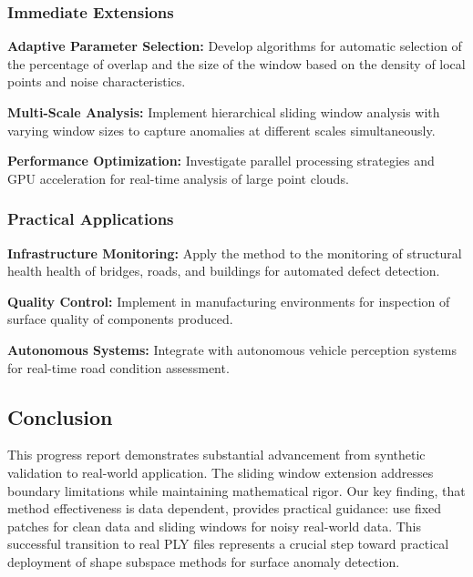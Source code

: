 \documentclass[../main.tex]{subfiles}
\begin{document}
\subsubsection{Immediate Extensions}

\textbf{Adaptive Parameter Selection:} Develop algorithms for automatic selection of the percentage of overlap and the size of the window based on the density of local points and noise characteristics.

\textbf{Multi-Scale Analysis:} Implement hierarchical sliding window analysis with varying window sizes to capture anomalies at different scales simultaneously.

\textbf{Performance Optimization:} Investigate parallel processing strategies and GPU acceleration for real-time analysis of large point clouds.

\subsubsection{Practical Applications}

\textbf{Infrastructure Monitoring:} Apply the method to the monitoring of structural health health of bridges, roads, and buildings for automated defect detection.

\textbf{Quality Control:} Implement in manufacturing environments for inspection of surface quality of components produced.

\textbf{Autonomous Systems:} Integrate with autonomous vehicle perception systems for real-time road condition assessment.

\subsection{Conclusion}

This progress report demonstrates substantial advancement from synthetic validation to real-world application. The sliding window extension addresses boundary limitations while maintaining mathematical rigor. Our key finding, that method effectiveness is data dependent, provides practical guidance: use fixed patches for clean data and sliding windows for noisy real-world data. This successful transition to real PLY files represents a crucial step toward practical deployment of shape subspace methods for surface anomaly detection.
\end{document}
